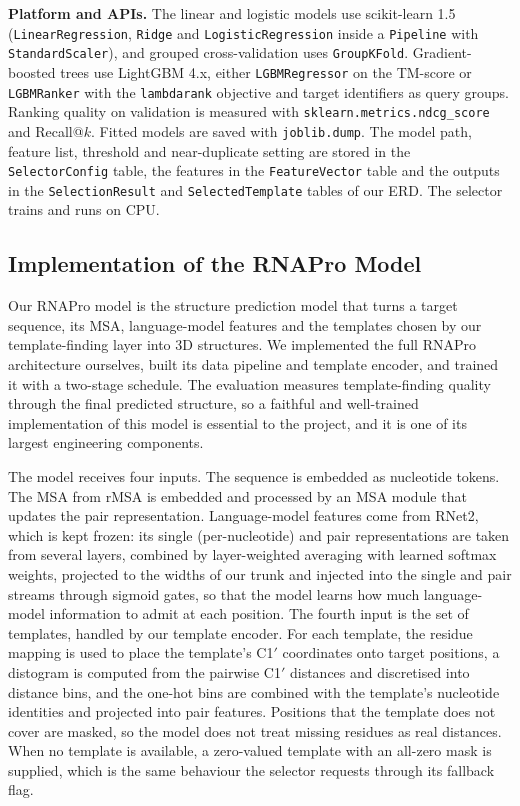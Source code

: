 \documentclass{FastFyp}
\begin{document}
\textbf{Platform and APIs.} The linear and logistic models use scikit-learn 1.5 (\texttt{LinearRegression}, \texttt{Ridge} and \texttt{LogisticRegression} inside a \texttt{Pipeline} with \texttt{StandardScaler}), and grouped cross-validation uses \texttt{GroupKFold}. Gradient-boosted trees use LightGBM 4.x, either \texttt{LGBMRegressor} on the TM-score or \texttt{LGBMRanker} with the \texttt{lambdarank} objective and target identifiers as query groups. Ranking quality on validation is measured with \texttt{sklearn.metrics.ndcg\_score} and Recall@$k$. Fitted models are saved with \texttt{joblib.dump}. The model path, feature list, threshold and near-duplicate setting are stored in the \texttt{SelectorConfig} table, the features in the \texttt{FeatureVector} table and the outputs in the \texttt{SelectionResult} and \texttt{SelectedTemplate} tables of our ERD. The selector trains and runs on CPU.

\subsection{Implementation of the RNAPro Model}
\label{sec:impl-rnapro}
Our RNAPro model is the structure prediction model that turns a target sequence, its MSA, language-model features and the templates chosen by our template-finding layer into 3D structures. We implemented the full RNAPro architecture \cite{leerna} ourselves, built its data pipeline and template encoder, and trained it with a two-stage schedule. The evaluation measures template-finding quality through the final predicted structure, so a faithful and well-trained implementation of this model is essential to the project, and it is one of its largest engineering components.

The model receives four inputs. The sequence is embedded as nucleotide tokens. The MSA from rMSA is embedded and processed by an MSA module that updates the pair representation. Language-model features come from RNet2, which is kept frozen: its single (per-nucleotide) and pair representations are taken from several layers, combined by layer-weighted averaging with learned softmax weights, projected to the widths of our trunk and injected into the single and pair streams through sigmoid gates, so that the model learns how much language-model information to admit at each position. The fourth input is the set of templates, handled by our template encoder. For each template, the residue mapping is used to place the template's C1$'$ coordinates onto target positions, a distogram is computed from the pairwise C1$'$ distances and discretised into distance bins, and the one-hot bins are combined with the template's nucleotide identities and projected into pair features. Positions that the template does not cover are masked, so the model does not treat missing residues as real distances. When no template is available, a zero-valued template with an all-zero mask is supplied, which is the same behaviour the selector requests through its fallback flag.
\end{document}
